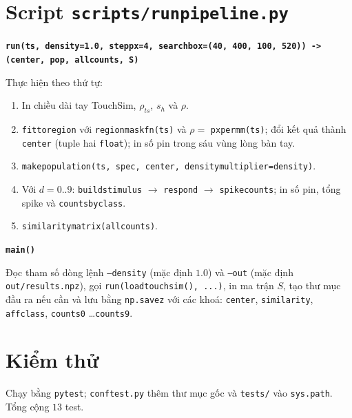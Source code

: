 \documentclass[11pt,a4paper]{article}
\renewcommand{\_}{\textunderscore\hspace{0pt}}
\newcommand{\code}[1]{\texttt{#1}}
\newcommand{\hs}{\ensuremath{s_h}}
\newcommand{\sig}[1]{\par\smallskip\noindent\textbf{\texttt{#1}}\par\nopagebreak}
\begin{document}
\section{Script \texttt{scripts/run\_pipeline.py}}
\sig{run(ts, density=1.0, step\_px=4, search\_box=(40, 400, 100, 520)) -> (center, pop, all\_counts, S)}
Thực hiện theo thứ tự:
\begin{enumerate}
\item In chiều dài tay TouchSim, $\rho_{ts}$, $\hs$ và $\rho$.
\item \code{fit\_to\_region} với \code{region\_mask\_fn(ts)} và $\rho=$ \code{px\_per\_mm(ts)}; đổi kết quả thành \code{center} (tuple hai \code{float}); in số pin trong sáu vùng lòng bàn tay.
\item \code{make\_population(ts, spec, center, density\_multiplier=density)}.
\item Với $d=0..9$: \code{build\_stimulus} $\to$ \code{respond} $\to$ \code{spike\_counts}; in số pin, tổng spike và \code{counts\_by\_class}.
\item \code{similarity\_matrix(all\_counts)}.
\end{enumerate}
\sig{main()}
Đọc tham số dòng lệnh \code{--density} (mặc định $1.0$) và \code{--out} (mặc định \code{out/results.npz}), gọi \code{run(load\_touchsim(), ...)}, in ma trận $S$, tạo thư mục đầu ra nếu cần và lưu bằng \code{np.savez} với các khoá: \code{center}, \code{similarity}, \code{affclass}, \code{counts\_0} \ldots \code{counts\_9}.

\section{Kiểm thử}
Chạy bằng \code{pytest}; \code{conftest.py} thêm thư mục gốc và \code{tests/} vào \code{sys.path}. Tổng cộng $13$ test.
\end{document}
